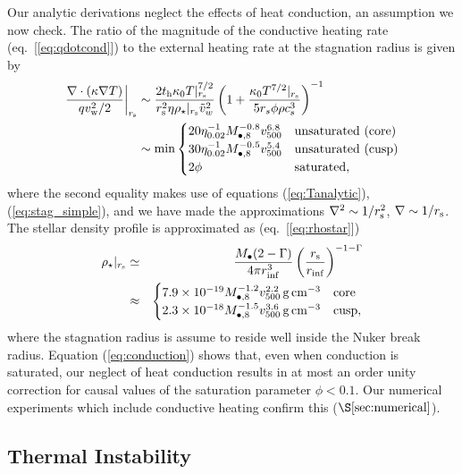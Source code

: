 \documentclass[usenatbib,fleqn]{mn2e}
\newcommand{\rs}{r_s}
\begin{document}
Our analytic derivations neglect the effects of heat conduction, an
assumption we now check.  The ratio of the magnitude of the conductive
heating rate (eq.~[\ref{eq:qdotcond}]) to the external heating rate at
the stagnation radius is given by
\begin{align}
  \left.\frac{\nabla\cdot(\kappa \nabla T)}{q v_{\rm
w}^{2}/2}\right|_{r_{\rm s}} &\sim \frac{2t_{\rm h}\kappa_0
T|_{r_{\rm s}}^{7/2}}{r_{\rm s}^{2}\eta \rho_{\star}|_{r_{\rm s}}
\tilde{v}_{w}^{2}}
 \left(1+\frac{\kappa_0 T^{7/2}|_{r_{\rm s}}}{5 \rs
    \phi \rho c_s^3}\right)^{-1}
\nonumber \\ &\sim {\rm min}
  \begin{cases}
  20 \eta_{0.02}^{-1}
M_{\bullet,8}^{-0.8} v_{500}^{6.8} &  \text{unsaturated (core)}\\
 30 \eta_{0.02}^{-1}
M_{\bullet,8}^{-0.5} v_{500}^{5.4} &  \text{unsaturated (cusp)}\\
  2 \phi & \text{saturated},
  \end{cases}
 \label{eq:conduction}
\end{align}
where the second equality makes use of equations (\ref{eq:Tanalytic}),
(\ref{eq:stag_simple}), and we have made the approximations $\nabla^{2} \sim
1/r_{\rm s}^{2}$, $\nabla \sim 1/r_{\rm s}$.  The
stellar density profile is approximated as (eq.~[\ref{eq:rhostar}])
\begin{eqnarray}
  \rho_{\star}|_{r_{\rm s}} &\simeq& \frac{M_{\bullet}(2-\Gamma)}{4\pi r_{\rm inf}^{3}}\left(\frac{r_{\rm s}}{r_{\rm inf}}\right)^{-1-\Gamma} \nonumber \\
 &\approx& \begin{cases}
    7.9 \times 10^{-19}M_{\bullet,8}^{-1.2}v_{500}^{2.2}\,{\rm g\,cm^{-3}}
    & \text{core} \\
    2.3 \times 10^{-18} M_{\bullet,8}^{-1.5}v_{500}^{3.6}
    \,{\rm g\,cm^{-3}}  & \text{cusp}, 
  \end{cases}
  \label{eq:rhostarrs}
\end{eqnarray}
where the stagnation radius is assume to reside well inside the Nuker
break radius.  Equation (\ref{eq:conduction}) shows that, even when conduction is saturated, our neglect of heat conduction
results in at most an order unity correction for causal values of
the saturation parameter $\phi < 0.1$.  Our numerical experiments which include conductive heating confirm this
($\S\ref{sec:numerical}$).




\subsection{Thermal Instability}
\label{sec:instability}
\end{document}
